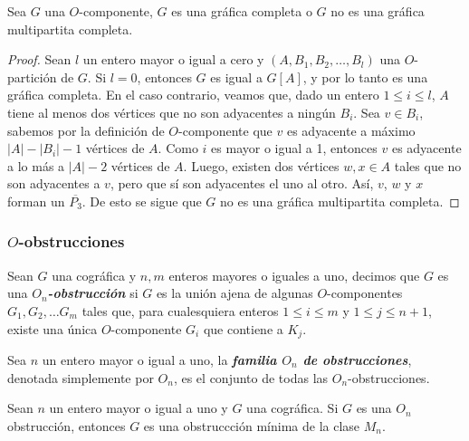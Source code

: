 \begin{lemma}
Sea $G$ una $O$-componente, $G$ es una gráfica completa o $G$ no es una gráfica multipartita completa.
\end{lemma}

\begin{proof}
Sean $l$ un entero mayor o igual a cero y $(A,B_1,B_2,\dots,B_l)$ una $O$-partición de $G$. Si $l=0$, entonces $G$ es igual a $G[A]$, y por lo tanto es una gráfica completa. En el caso contrario, veamos que, dado un entero $1\le i\le l$, $A$ tiene al menos dos vértices que no son adyacentes a ningún $B_i$. Sea $v\in B_i$, sabemos por la definición de $O$-componente que $v$ es adyacente a máximo $|A|-|B_i|-1$ vértices de $A$. Como $i$ es mayor o igual a 1, entonces $v$ es adyacente a lo más a $|A|-2$ vértices de $A$. Luego, existen dos vértices $w,x\in A$ tales que no son adyacentes a $v$, pero que sí son adyacentes el uno al otro. Así, $v$, $w$ y $x$ forman un $\overline{P_3}$. De esto se sigue que $G$ no es una gráfica multipartita completa.
\end{proof}

\subsubsection{$O$-obstrucciones}

Sean $G$ una cográfica y $n,m$ enteros mayores o iguales a uno, decimos que $G$ es una \emph{\textbf{$O_n$-obstrucción}} si $G$ es la unión ajena de algunas $O$-componentes $G_1,G_2,\dots G_m$ tales que, para cualesquiera enteros $1\le i \le m$ y $1\le j \le n+1$, existe una única $O$-componente $G_i$ que contiene a $K_j$.

Sea $n$ un entero mayor o igual a uno, la \emph{\textbf{familia $O_n$ de obstrucciones}}, denotada simplemente por $O_n$, es el conjunto de todas las $O_n$-obstrucciones.

\begin{theorem}
Sean $n$ un entero mayor o igual a uno y $G$ una cográfica. Si $G$ es una $O_n$ obstrucción, entonces $G$ es una obstruccción mínima de la clase $M_n$.
\end{theorem}

